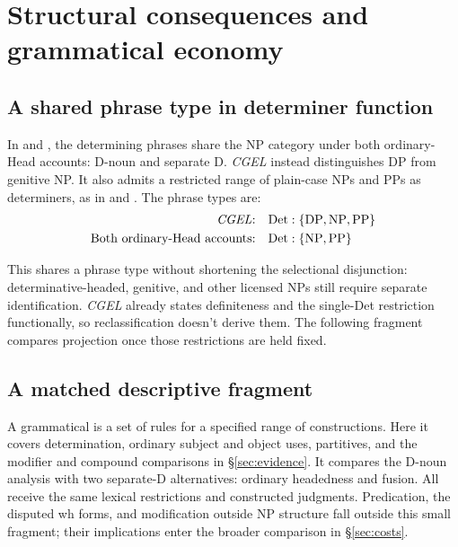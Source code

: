 \documentclass[12pt]{article}
\begin{document}
\section{Structural consequences and grammatical economy}\label{sec:economy}

\subsection{A shared phrase type in determiner function}\label{sec:det-uniform}

In  and , the determining phrases share the NP category under both ordinary-Head accounts: D-noun and separate D. \textit{CGEL} instead distinguishes DP from genitive NP. It also admits a restricted range of plain-case NPs and PPs as determiners, as in  and  \citep[Ch.~5, §4]{huddleston2002}. The phrase types are:
\[
\begin{aligned}
\text{\textit{CGEL}:} &\quad \mathrm{Det}:\{\mathrm{DP},\mathrm{NP},\mathrm{PP}\} \\
\text{Both ordinary-Head accounts:} &\quad \mathrm{Det}:\{\mathrm{NP},\mathrm{PP}\}
\end{aligned}
\]

This shares a phrase type without shortening the selectional disjunction: determinative-headed, genitive, and other licensed NPs still require separate identification. \textit{CGEL} already states definiteness and the single-Det restriction functionally, so reclassification doesn't derive them. The following fragment compares projection once those restrictions are held fixed.

\subsection{A matched descriptive fragment}\label{sec:fragment}

A grammatical  is a set of rules for a specified range of constructions. Here it covers determination, ordinary subject and object uses, partitives, and the modifier and compound comparisons in §\ref{sec:evidence}. It compares the D-noun analysis with two separate-D alternatives: ordinary headedness and fusion. All receive the same lexical restrictions and constructed judgments. Predication, the disputed wh forms, and modification outside NP structure fall outside this small fragment; their implications enter the broader comparison in §\ref{sec:costs}.
\end{document}
